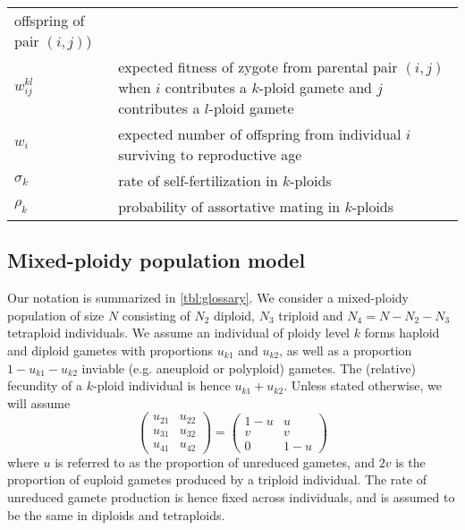\documentclass[12pt,a4paper]{article}
\begin{document}
\begin{table}[t]
\begin{tabularx}{\linewidth}{lX}
        offspring of pair $(i,j)$)\\
    $w_{ij}^{kl}$ & expected fitness of zygote from parental pair $(i,j)$ when
        $i$ contributes a $k$-ploid gamete and $j$ contributes a $l$-ploid gamete \\
    $w_i$ & expected number of offspring from individual $i$ surviving to
        reproductive age \\
    $\sigma_k$ & rate of self-fertilization in $k$-ploids \\
    $\rho_k$ & probability of assortative mating in $k$-ploids \\
    \cline{1-2}
    \end{tabularx}%
    \end{table}

    \subsection*{Mixed-ploidy population model}

    Our notation is summarized in \cref{tbl:glossary}.
    We consider a mixed-ploidy population of size $N$ consisting of $N_2$ diploid,
    $N_3$ triploid and $N_4=N-N_2-N_3$ tetraploid individuals.
    We assume an individual of ploidy level $k$ forms haploid and diploid gametes
    with proportions $u_{k1}$ and $u_{k2}$, as well as a proportion
    $1-u_{k1}-u_{k2}$ inviable (e.g. aneuploid or polyploid) gametes.
    The (relative) fecundity of a $k$-ploid individual is hence $u_{k1} + u_{k2}$.
    Unless stated otherwise, we will assume 
    \begin{equation}
        \begin{pmatrix} 
        u_{21} & u_{22} \\ 
        u_{31} & u_{32} \\ 
        u_{41} & u_{42} 
        \end{pmatrix} =
        \begin{pmatrix} 
        1-u & u \\
        v & v \\
        0 & 1-u
        \end{pmatrix} \label{eq:U}
    \end{equation}
    where $u$ is referred to as the proportion of unreduced gametes, and $2v$ is
    the proportion of euploid gametes produced by a triploid individual.
    The rate of unreduced gamete production is hence fixed across individuals, and
    is assumed to be the same in diploids and tetraploids.
\end{document}
